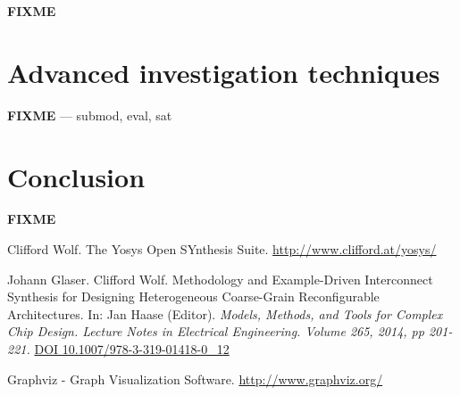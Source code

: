 \documentclass[9pt,technote,a4paper]{IEEEtran}
\def\FIXME{{\color{red}\bf FIXME}}
\begin{document}
\FIXME{}

\section{Advanced investigation techniques}
\label{poke}

\FIXME{} --- submod, eval, sat

\section{Conclusion}
\label{conclusion}

\FIXME

\begin{thebibliography}{9}

Clifford Wolf. The Yosys Open SYnthesis Suite.
\url{http://www.clifford.at/yosys/}

Johann Glaser. Clifford Wolf. Methodology and Example-Driven Interconnect
Synthesis for Designing Heterogeneous Coarse-Grain Reconfigurable
Architectures. In: Jan Haase (Editor). {\it Models, Methods, and Tools for Complex Chip Design.
Lecture Notes in Electrical Engineering. Volume 265, 2014, pp 201-221.\/}
\href{http://dx.doi.org/10.1007/978-3-319-01418-0_12}{DOI 10.1007/978-3-319-01418-0\_12}

Graphviz - Graph Visualization Software.
\url{http://www.graphviz.org/}

\end{thebibliography}
\end{document}
